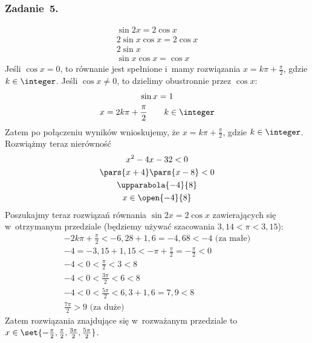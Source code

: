 \subsubsection*{Zadanie~5.}
\begin{gather*}
    \sin2x = 2\cos x\\
    2\sin x\cos x = 2\cos x\\
    2\sin x\\
    \sin x\cos x = \cos x
\end{gather*}
Jeśli \(\cos x = 0\), to równanie jest spełnione i~mamy rozwiązania \(x = k\pi + \frac{\pi}{2}\), gdzie \(k \in \integer\). Jeśli \(\cos x \neq 0\), to dzielimy obustronnie przez \(\cos x\):
\begin{gather*}
    \sin x = 1\\
    x = 2k\pi + \frac{\pi}{2} \qquad k \in \integer
\end{gather*}
Zatem po połączeniu wyników wnioskujemy, że \(x = k\pi + \frac{\pi}{2}\), gdzie \(k \in \integer\). Rozwiążmy teraz nierówność
\begin{gather*}
    x^2 - 4x - 32 < 0\\
    \pars{x + 4}\pars{x - 8} < 0\\
    \upparabola{-4}{8}\\
    x \in \open{-4}{8}
\end{gather*}
Poszukajmy teraz rozwiązań równania \(\sin2x = 2\cos x\) zawierających się w~otrzymanym przedziale (będziemy używać szacowania \(3{,}14 < \pi < 3{,}15\)):
\begin{gather*}
    -2k\pi + \frac{\pi}{2} < -6{,}28 + 1{,}6 = -4{,}68 < -4 \text{ (za małe)}\\
    -4 = -3{,}15 + 1{,15} < -\pi + \frac{\pi}{2} = -\frac{\pi}{2} < 0\\
    -4 < 0 < \frac{\pi}{2} < 3 < 8\\
    -4 < 0 < \frac{3\pi}{2} < 6 < 8\\
    -4 < 0 < \frac{5\pi}{2} < 6{,}3 + 1{,}6 = 7{,}9 < 8\\
    \frac{7\pi}{2} > 9 \text{ (za duże)}
\end{gather*}
Zatem rozwiązania znajdujące się w~rozważanym przedziale to \(x \in \set{-\frac{\pi}{2}, \frac{\pi}{2}, \frac{3\pi}{2}, \frac{5\pi}{2}}\).
